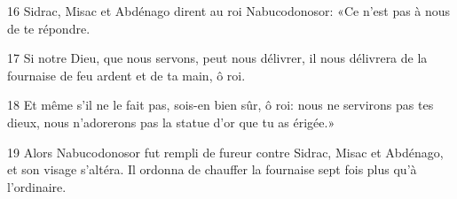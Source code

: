 
16 Sidrac, Misac et Abdénago dirent au roi Nabucodonosor: «Ce n’est pas à nous de te répondre.

17 Si notre Dieu, que nous servons, peut nous délivrer, il nous délivrera de la fournaise de feu ardent et de ta main, ô roi.

18 Et même s’il ne le fait pas, sois-en bien sûr, ô roi: nous ne servirons pas tes dieux, nous n’adorerons pas la statue d’or que tu as érigée.»

19 Alors Nabucodonosor fut rempli de fureur contre Sidrac, Misac et Abdénago, et son visage s’altéra. Il ordonna de chauffer la fournaise sept fois plus qu’à l’ordinaire.
